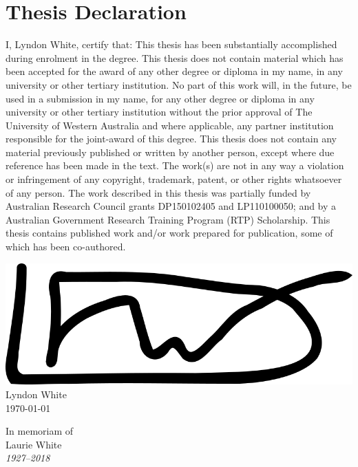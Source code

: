 \documentclass{book}
\begin{document}
\section*{Thesis Declaration}
\vskip 0.8cm
\begin{flushleft}
	I, Lyndon White, certify that:
	\vskip 0.5cm 
	This thesis has been substantially accomplished during enrolment in the degree.
	\vskip 0.25cm
	This thesis does not contain material which has been accepted for the award of any other degree or diploma in my name, in any university or other tertiary institution.
	\vskip 0.25cm
	No part of this work will, in the future, be used in a submission in my name, for any other degree or diploma in any university or other tertiary institution without the prior approval of The University of Western Australia and where applicable, any partner institution responsible for the joint-award of this degree.
	\vskip 0.25cm
	This thesis does not contain any material previously published or written by another person, except where due reference has been made in the text. 
	\vskip 0.25cm
	The work(s) are not in any way a violation or infringement of any copyright, trademark, patent, or other rights whatsoever of any person.
	\vskip 0.25cm
	The work described in this thesis was partially funded by 
	Australian Research Council grants DP150102405 and LP110100050;
	and by a Australian Government Research Training Program (RTP) Scholarship.
	\vskip 0.25cm
	This thesis contains published work and/or work prepared for publication, some of which has been co-authored. 
	\vskip 0.5cm

	\includegraphics[height=2\baselineskip]{signatures/white}
	\vskip 0.15cm
	Lyndon White\\
	\today
\end{flushleft}




{%
	\clearpage
	\thispagestyle{empty}
	\centering
	{
		In memoriam of\\
		Laurie White\\
		\emph{1927--2018}\\
	}
	\clearpage
}
\end{document}
